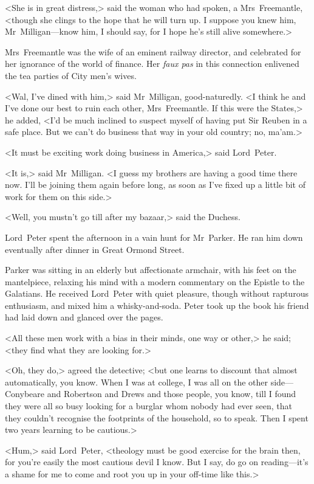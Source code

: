 <She is in great distress,> said the woman who had spoken, a Mrs~Freemantle, <though she clings to the hope that he will turn up. I suppose you knew him, Mr~Milligan—know him, I should say, for I hope he's still alive somewhere.>

Mrs~Freemantle was the wife of an eminent railway director, and celebrated for her ignorance of the world of finance. Her \textit{faux pas} in this connection enlivened the tea parties of City men's wives.

<Wal, I've dined with him,> said Mr~Milligan, good-naturedly. <I think he and I've done our best to ruin each other, Mrs~Freemantle. If this were the States,> he added, <I'd be much inclined to suspect myself of having put Sir Reuben in a safe place. But we can't do business that way in your old country; no, ma'am.>

<It must be exciting work doing business in America,> said Lord~Peter.

<It is,> said Mr~Milligan. <I guess my brothers are having a good time there now. I'll be joining them again before long, as soon as I've fixed up a little bit of work for them on this side.>

<Well, you mustn't go till after my bazaar,> said the Duchess.

Lord~Peter spent the afternoon in a vain hunt for Mr~Parker. He ran him down eventually after dinner in Great Ormond Street.

Parker was sitting in an elderly but affectionate armchair, with his feet on the mantelpiece, relaxing his mind with a modern commentary on the Epistle to the Galatians. He received Lord~Peter with quiet pleasure, though without rapturous enthusiasm, and mixed him a whisky-and-soda. Peter took up the book his friend had laid down and glanced over the pages.

<All these men work with a bias in their minds, one way or other,> he said; <they find what they are looking for.>

<Oh, they do,> agreed the detective; <but one learns to discount that almost automatically, you know. When I was at college, I was all on the other side—Conybeare and Robertson and Drews and those people, you know, till I found they were all so busy looking for a burglar whom nobody had ever seen, that they couldn't recognise the footprints of the household, so to speak. Then I spent two years learning to be cautious.>

<Hum,> said Lord~Peter, <theology must be good exercise for the brain then, for you're easily the most cautious devil I know. But I say, do go on reading—it's a shame for me to come and root you up in your off-time like this.>

